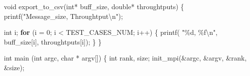 \documentclass[11pt]{article}
\newenvironment{Shaded}{}{}
\newcommand{\DataTypeTok}[1]{\textcolor[rgb]{0.56,0.13,0.00}{{#1}}}
\newcommand{\DecValTok}[1]{\textcolor[rgb]{0.25,0.63,0.44}{{#1}}}
\newcommand{\StringTok}[1]{\textcolor[rgb]{0.25,0.44,0.63}{{#1}}}
\newcommand{\NormalTok}[1]{{#1}}
\newcommand{\SpecialCharTok}[1]{\textcolor[rgb]{0.25,0.44,0.63}{{#1}}}
\newcommand{\ControlFlowTok}[1]{\textcolor[rgb]{0.00,0.44,0.13}{\textbf{{#1}}}}
\newcommand{\OperatorTok}[1]{\textcolor[rgb]{0.40,0.40,0.40}{{#1}}}
\begin{document}
\begin{Shaded}
\begin{Highlighting}[]
\DataTypeTok{void}\NormalTok{ export\_to\_csv}\OperatorTok{(}\DataTypeTok{int}\OperatorTok{*}\NormalTok{ buff\_size}\OperatorTok{,} \DataTypeTok{double}\OperatorTok{*}\NormalTok{ throughtputs}\OperatorTok{)} \OperatorTok{\{}
\NormalTok{  printf}\OperatorTok{(}\StringTok{"Message\_size, Throughtput}\SpecialCharTok{\textbackslash{}n}\StringTok{"}\OperatorTok{);}
  
  \DataTypeTok{int}\NormalTok{ i}\OperatorTok{;}
  \ControlFlowTok{for} \OperatorTok{(}\NormalTok{i }\OperatorTok{=} \DecValTok{0}\OperatorTok{;}\NormalTok{ i }\OperatorTok{\textless{}}\NormalTok{ TEST\_CASES\_NUM}\OperatorTok{;}\NormalTok{ i}\OperatorTok{++)} \OperatorTok{\{}
\NormalTok{    printf}\OperatorTok{(} \StringTok{"\%d, \%f}\SpecialCharTok{\textbackslash{}n}\StringTok{"}\OperatorTok{,}\NormalTok{ buff\_size}\OperatorTok{[}\NormalTok{i}\OperatorTok{],}\NormalTok{ throughtputs}\OperatorTok{[}\NormalTok{i}\OperatorTok{]);}
  \OperatorTok{\}}
\OperatorTok{\}}

\DataTypeTok{int}\NormalTok{ main }\OperatorTok{(}\DataTypeTok{int}\NormalTok{ argc}\OperatorTok{,} \DataTypeTok{char} \OperatorTok{*}\NormalTok{ argv}\OperatorTok{[])}
\OperatorTok{\{}
  \DataTypeTok{int}\NormalTok{ rank}\OperatorTok{,}\NormalTok{ size}\OperatorTok{;}
\NormalTok{  init\_mpi}\OperatorTok{(\&}\NormalTok{argc}\OperatorTok{,} \OperatorTok{\&}\NormalTok{argv}\OperatorTok{,} \OperatorTok{\&}\NormalTok{rank}\OperatorTok{,} \OperatorTok{\&}\NormalTok{size}\OperatorTok{);}
 

\end{Highlighting}
\end{Shaded}
\end{document}
